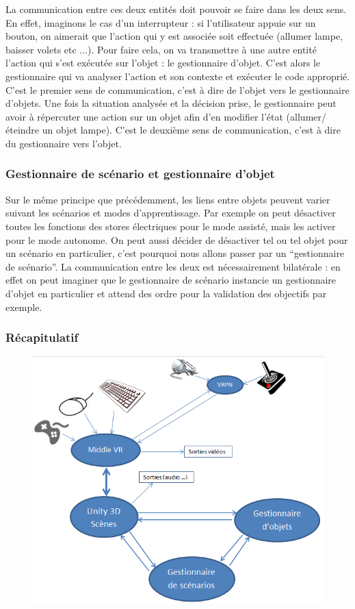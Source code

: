 La communication entre ces deux entités doit pouvoir se faire dans les deux sens.
En effet, imaginons le cas d'un interrupteur : si l'utilisateur appuie sur un bouton, on aimerait que l'action qui y est associée soit effectuée (allumer lampe, baisser volets etc ...).
Pour faire cela, on va transmettre à une autre entité l'action qui s'est exécutée sur l'objet : le gestionnaire d'objet.
C'est alors le gestionnaire qui va analyser l'action et son contexte et exécuter le code approprié. C'est le premier sens de communication, c'est à dire de l'objet vers le gestionnaire d'objets.
Une fois la situation analysée et la décision prise, le gestionnaire peut avoir à répercuter une action sur un objet afin d'en modifier l'état (allumer/éteindre un objet lampe).
C'est le deuxième sens de communication, c'est à dire du gestionnaire vers l'objet.

\subsubsection{Gestionnaire de scénario et gestionnaire d'objet}

Sur le même principe que précédemment, les liens entre objets peuvent varier suivant les scénarios et modes d'apprentissage.
Par exemple on peut désactiver toutes les fonctions des stores électriques pour le mode assisté, mais les activer pour le mode autonome.
On peut aussi décider de désactiver tel ou tel objet pour un scénario en particulier, c'est pourquoi nous allons passer par un \enquote{gestionnaire de scénario}.
La communication entre les deux est nécessairement bilatérale : en effet on peut imaginer que le gestionnaire de scénario instancie un gestionnaire d'objet en particulier et attend des ordre pour la validation des objectifs par exemple.

\subsubsection{Récapitulatif}
\begin{figure}
	\centering
		\includegraphics[width=\textwidth]{2-Specifications/img/recap.png}
	\label{fig:unityvr}
\end{figure}


